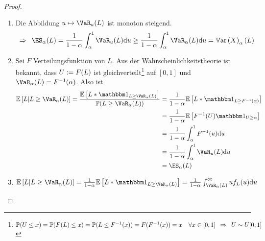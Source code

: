 \begin{proof}
	\begin{enumerate}[label=(zu \alph*), leftmargin=*]
		\item Die Abbildung $u \mapsto \VaR_u(L)$ ist monoton steigend. 
		\begin{equation*}
			\follows \ES_\alpha(L) = \frac{1}{1-\alpha} \int_\alpha^1 \VaR_u(L) \diff{u} \ge \frac{1}{1-\alpha} \int_\alpha^1 \VaR_\alpha(L) \diff{u} = \Var_\alpha(L)
		\end{equation*}
		\item Sei $F$ Verteilungsfunktion von $L$. Aus der Wahrscheinlichkeitstheorie ist bekannt, dass $U \mathrel{:=} F(L)$ ist gleichverteilt\footnote{$\mathbb{P}(U \le x) = \mathbb{P}(F(L) \le x) = \mathbb{P}(L \le F^{-1}(x)) = F(F^{-1}(x)) = x \quad \forall x \in [0,1] \enskip \Rightarrow \enskip U \sim U[0,1]$} auf $[0,1]$ und $\VaR_\alpha(L) = F^{-1}(\alpha)$. Also ist 
		\begin{equation*}
		\begin{aligned}
			\EW[L | L \ge \VaR_\alpha(L)] 
			= \frac{\EW[L * \one_{L \ge \VaR_\alpha(L)}]}{\P(L \ge \VaR_\alpha(L))} 
			&= \frac{1}{1-\alpha} \EW[L * \one_{L \ge F^{-1}(\alpha)}] \\
			&= \frac{1}{1-\alpha} \EW[F^{-1}(U) \one_{U \ge \alpha}] \\
			&= \frac{1}{1-\alpha} \int_\alpha^1 F^{-1}(u) \diff{u} \\
			&= \frac{1}{1-\alpha} \int_\alpha^1 \VaR_u(L) \diff{u} \\
			&= \ES_\alpha(L)
		\end{aligned}
		\end{equation*}
		\item $\EW[L | L \ge \VaR_\alpha(L)] = \frac{1}{1-\alpha} \EW[L * \one_{L \ge \VaR_\alpha(L)}] = \frac{1}{1-\alpha} \int_{\VaR_\alpha(L)}^\infty u f_L(u) \diff{u}$
	\end{enumerate}
\end{proof}


